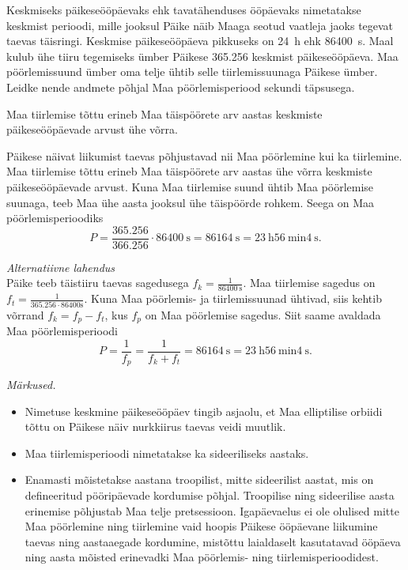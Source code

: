 
Keskmiseks päikeseööpäevaks ehk tavatähenduses ööpäevaks nimetatakse keskmist perioodi, mille jooksul Päike näib Maaga seotud vaatleja jaoks tegevat taevas täisringi. Keskmise päikeseööpäeva pikkuseks on \SI{24}{\hour} ehk \SI{86400}{\second}. Maal kulub ühe tiiru tegemiseks ümber Päikese \SI{365.256}{} keskmist päikeseööpäeva. Maa pöörlemissuund ümber oma telje ühtib selle tiirlemissuunaga Päikese ümber. Leidke nende andmete põhjal Maa pöörlemisperiood sekundi täpsusega. 

\hint
Maa tiirlemise tõttu erineb Maa täispöörete arv aastas keskmiste päikeseööpäevade arvust ühe võrra.

\solu
Päikese näivat liikumist taevas põhjustavad nii Maa pöörlemine kui ka tiirlemine. Maa tiirlemise tõttu erineb Maa täispöörete arv aastas ühe võrra keskmiste päikeseööpäevade arvust. Kuna Maa tiirlemise suund ühtib Maa pöörlemise suunaga, teeb Maa ühe aasta jooksul ühe täispöörde rohkem. Seega on Maa pöörlemisperioodiks
\[
P=\frac{\num{365,256}}{\num{366,256}} \cdot \SI{86400}{\second}=\SI{86164}{\second}=\SI{23}{\hour} \SI{56}{\minute} \SI{4}{\second}.
\]

\vspace{0.5\baselineskip}
\emph{Alternatiivne lahendus}\\
Päike teeb täistiiru taevas sagedusega $f_k=\frac{1}{\SI{86400}{\second}}$. Maa tiirlemise sagedus on $f_t=\frac{1}{\num{365,256}\cdot86400\text{s}}$. Kuna Maa pöörlemis- ja tiirlemissuunad ühtivad, siis kehtib võrrand $f_k=f_p-f_t$, kus $f_p$ on Maa pöörlemise sagedus. Siit saame avaldada Maa pöörlemisperioodi 
\[
P=\frac{1}{f_p}=\frac{1}{f_k+f_t}=\SI{86164}{\second}=\SI{23}{\hour} \SI{56}{\minute} \SI{4}{\second}.
\]

\emph{Märkused.}

\vspace{-5pt}
\begin{itemize}[noitemsep, leftmargin=*]
\item Nimetuse keskmine päikeseööpäev tingib asjaolu, et Maa elliptilise orbiidi tõttu on Päikese näiv nurkkiirus taevas veidi muutlik.
\item Maa tiirlemisperioodi nimetatakse ka sideeriliseks aastaks. 
\item Enamasti mõistetakse aastana troopilist, mitte sideerilist aastat, mis on defineeritud pööripäevade kordumise põhjal. Troopilise ning sideerilise aasta erinemise põhjustab Maa telje pretsessioon. Igapäevaelus ei ole olulised mitte Maa pöörlemine ning tiirlemine vaid hoopis Päikese ööpäevane liikumine taevas ning aastaaegade kordumine, mistõttu laialdaselt kasutatavad ööpäeva ning aasta mõisted erinevadki Maa pöörlemis- ning tiirlemisperioodidest. 
\end{itemize}

